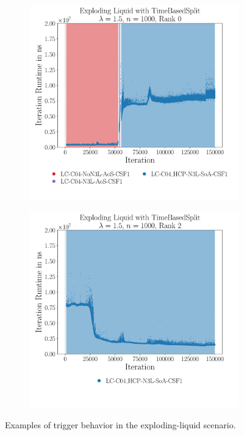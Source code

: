 \begin{figure}[htpb]
	\begin{subfigure}[t]{0.5\textwidth}
		\vskip 0pt
		\centering
		\includegraphics[width=\textwidth]{./Figures/plots/exploding-liquid_configs_good.pdf}
		\vspace*{-1cm}
	\end{subfigure}%
	\begin{subfigure}[t]{0.5\textwidth}
		\vskip 0pt
		\centering
		\includegraphics[width=\textwidth]{./Figures/plots/exploding-liquid_configs_bad.pdf}
		\vspace*{-1cm}
	\end{subfigure}
	\caption{Examples of trigger behavior in the exploding-liquid scenario.}
	\label{fig:expl_trigger_behavior}
\end{figure}

